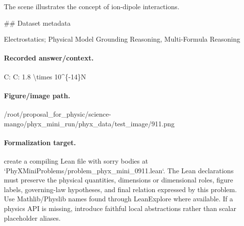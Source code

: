 The scene illustrates the concept of ion-dipole interactions.

\#\# Dataset metadata

Electrostatics; Physical Model Grounding Reasoning, Multi-Formula Reasoning

\paragraph{Recorded answer/context.}
C: C: 1.8 \textbackslash{}times 10\textasciicircum{}\{-14\}N

\paragraph{Figure/image path.}
/root/proposal\_for\_physic/science-mango/phyx\_mini\_run/phyx\_data/test\_image/911.png

\paragraph{Formalization target.}
create a compiling Lean file with sorry bodies at `PhyXMiniProblems/problem\_phyx\_mini\_0911.lean`. The Lean declarations must preserve the physical quantities, dimensions or dimensional roles, figure labels, governing-law hypotheses, and final relation expressed by this problem.
Use Mathlib/Physlib names found through LeanExplore where available. If a physics API is missing, introduce faithful local abstractions rather than scalar placeholder aliases.

